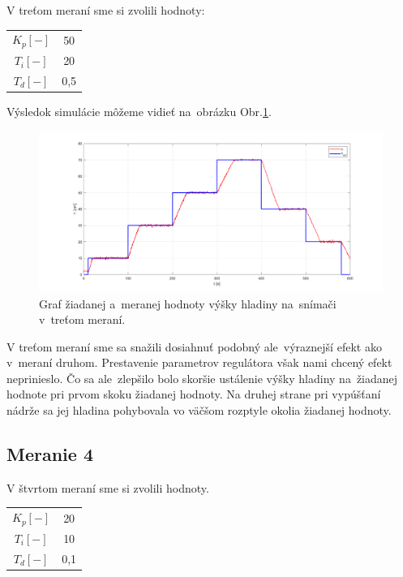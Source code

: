 \documentclass{article}
\begin{document}
V treťom meraní sme si zvolili hodnoty:

\begin{center}
\begin{tabular}{ |c|c| }
 \hline
 $K_p [-]$ & 50 \\
 $T_i [-]$ & 20 \\
 $T_d [-]$ & 0,5 \\
 \hline
\end{tabular}
\end{center}

Výsledok simulácie môžeme vidieť na~obrázku Obr.\ref{fig:m3}.

\begin{figure}[!htbp]
	\begin{center}
		\includegraphics[width=\textwidth]{./include/meranie3.png}
	\end{center}
	\caption{Graf žiadanej a~meranej hodnoty výšky hladiny na~snímači v~treťom meraní.}
	\label{fig:m3}
\end{figure}

V treťom meraní sme sa snažili dosiahnuť podobný ale~výraznejší efekt ako v~meraní druhom. Prestavenie
parametrov regulátora však nami chcený efekt neprinieslo. Čo sa ale~zlepšilo bolo skoršie ustálenie výšky
hladiny na~žiadanej hodnote pri prvom skoku žiadanej hodnoty. Na druhej strane pri vypúšťaní nádrže sa jej
hladina pohybovala vo väčšom rozptyle okolia žiadanej hodnoty.

\clearpage

\subsection{Meranie 4}
\label{sec:meranie4}

V štvrtom meraní sme si zvolili hodnoty. 

\begin{center}
\begin{tabular}{ |c|c| }
 \hline
 $K_p [-]$ & 20 \\
 $T_i [-]$ & 10 \\
 $T_d [-]$ & 0,1 \\
 \hline
\end{tabular}
\end{center}
\end{document}
